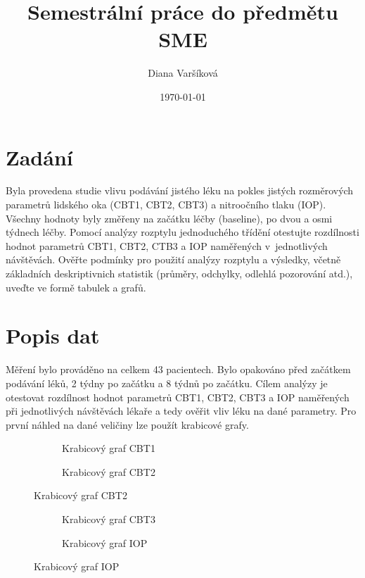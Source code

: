 \documentclass{article}
\begin{document}
\title{Semestrální práce do předmětu SME}
\author{Diana Varšíková}
\date{\today}

\maketitle

\section{Zadání}
Byla provedena studie vlivu podávání jistého léku na pokles jistých rozměrových parametrů lidského oka (CBT1, CBT2, CBT3) a nitroočního tlaku (IOP). 
Všechny hodnoty byly změřeny na začátku léčby (baseline), po dvou a osmi týdnech léčby. 
Pomocí analýzy rozptylu jednoduchého třídění otestujte rozdílnosti hodnot parametrů CBT1, CBT2, CTB3 a IOP naměřených v jednotlivých návštěvách. 
Ověřte podmínky pro použití analýzy rozptylu a výsledky, včetně základních deskriptivnich statistik (průměry, odchylky, odlehlá pozorování atd.), 
uveďte ve formě tabulek a grafů.
   

\section{Popis dat}

Měření bylo prováděno na celkem 43 pacientech. Bylo opakováno před začátkem podávání léků, 2 týdny po začátku a 8 týdnů po začátku.
Cílem analýzy je otestovat rozdílnost hodnot parametrů CBT1, CBT2, CBT3 a IOP naměřených při jednotlivých návštěvách lékaře
a tedy ověřit vliv léku na dané parametry. Pro první náhled na dané veličiny lze použít krabicové grafy.

\begin{figure}[H]
  \centering
  \begin{subfigure}{0.45\textwidth}
    
    \caption{Krabicový graf CBT1}
  \end{subfigure}
  \begin{subfigure}{0.45\textwidth}
    
    \caption{Krabicový graf CBT2}
  \end{subfigure}
\end{figure}

\begin{figure}[H]
  \centering
  \begin{subfigure}{0.45\textwidth}
    
    \caption{Krabicový graf CBT3}
  \end{subfigure}
  \begin{subfigure}{0.45\textwidth}
    
    \caption{Krabicový graf IOP}
  \end{subfigure}
\end{figure}
\end{document}
